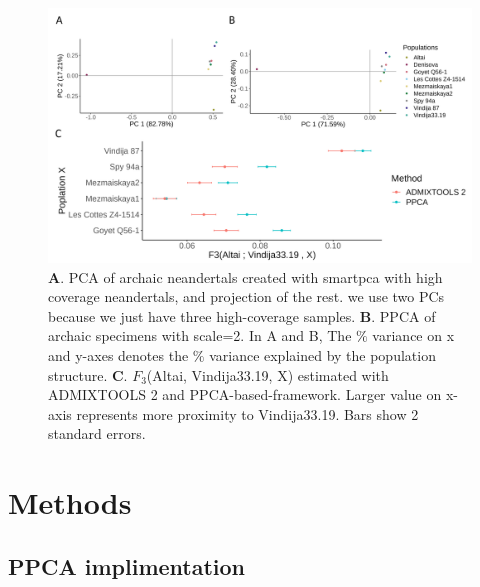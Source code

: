 \documentclass[12pt]{article}
\begin{document}
\begin{figure}[ht!]
    \includegraphics[width=16.5cm]{Images/Figures/nea_main.png}
    \centering
    \caption{\textbf{A}. PCA of archaic neandertals created with smartpca with high coverage neandertals, and projection of the rest. we use  two PCs because we just have three high-coverage samples.
    \textbf{B}. PPCA of archaic specimens with scale=2. In A and B, The $\%$ variance on x and y-axes denotes the $\%$ variance explained by the population structure. \textbf{C}. $F_3$(Altai, Vindija33.19, X) estimated with ADMIXTOOLS 2 and PPCA-based-framework. Larger value on x-axis represents more proximity to Vindija33.19. Bars show 2 standard errors.}
    \label{fig:nea_f3}
\end{figure}


\section{Methods}\label{ch2_methods}

\subsection{PPCA implimentation}\label{method-ppca}
\end{document}
